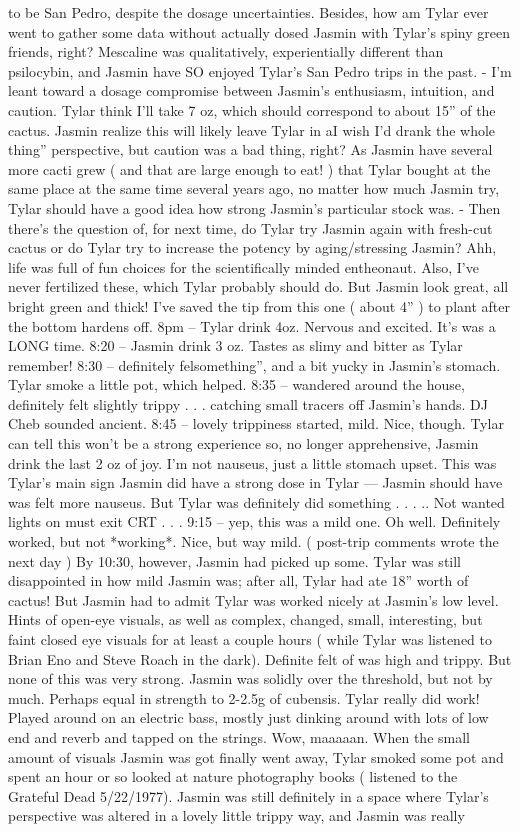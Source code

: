 \documentclass[12pt]{book}
\begin{document}
to be San Pedro, despite the dosage uncertainties. Besides, how am Tylar ever went to gather some data without actually dosed Jasmin with Tylar's spiny green friends, right? Mescaline was qualitatively, experientially different than psilocybin, and Jasmin have SO enjoyed Tylar's San Pedro trips in the past. - I'm leant toward a dosage compromise between Jasmin's enthusiasm, intuition, and caution. Tylar think I'll take 7 oz, which should correspond to about 15'' of the cactus. Jasmin realize this will likely leave Tylar in aI wish I'd drank the whole thing'' perspective, but caution was a bad thing, right? As Jasmin have several more cacti grew ( and that are large enough to eat! ) that Tylar bought at the same place at the same time several years ago, no matter how much Jasmin try, Tylar should have a good idea how strong Jasmin's particular stock was. - Then there's the question of, for next time, do Tylar try Jasmin again with fresh-cut cactus or do Tylar try to increase the potency by aging/stressing Jasmin? Ahh, life was full of fun choices for the scientifically minded entheonaut. Also, I've never fertilized these, which Tylar probably should do. But Jasmin look great, all bright green and thick! I've saved the tip from this one ( about 4'' ) to plant after the bottom hardens off. 8pm -- Tylar drink 4oz. Nervous and excited. It's was a LONG time. 8:20 -- Jasmin drink 3 oz. Tastes as slimy and bitter as Tylar remember! 8:30 -- definitely felsomething'', and a bit yucky in Jasmin's stomach. Tylar smoke a little pot, which helped. 8:35 -- wandered around the house, definitely felt slightly trippy . . . catching small tracers off Jasmin's hands. DJ Cheb sounded ancient. 8:45 -- lovely trippiness started, mild. Nice, though. Tylar can tell this won't be a strong experience so, no longer apprehensive, Jasmin drink the last 2 oz of joy. I'm not nauseus, just a little stomach upset. This was Tylar's main sign Jasmin did have a strong dose in Tylar --- Jasmin should have was felt more nauseus. But Tylar was definitely did something . . . .. Not wanted lights on must exit CRT . . .  9:15 -- yep, this was a mild one. Oh well. Definitely worked, but not *working*. Nice, but way mild. ( post-trip comments wrote the next day ) By 10:30, however, Jasmin had picked up some. Tylar was still disappointed in how mild Jasmin was; after all, Tylar had ate 18'' worth of cactus! But Jasmin had to admit Tylar was worked nicely at Jasmin's low level. Hints of open-eye visuals, as well as complex, changed, small, interesting, but faint closed eye visuals for at least a couple hours ( while Tylar was listened to Brian Eno and Steve Roach in the dark). Definite felt of was high and trippy. But none of this was very strong. Jasmin was solidly over the threshold, but not by much. Perhaps equal in strength to 2-2.5g of cubensis. Tylar really did work! Played around on an electric bass, mostly just dinking around with lots of low end and reverb and tapped on the strings. Wow, maaaaan. When the small amount of visuals Jasmin was got finally went away, Tylar smoked some pot and spent an hour or so looked at nature photography books ( listened to the Grateful Dead 5/22/1977). Jasmin was still definitely in a space where Tylar's perspective was altered in a lovely little trippy way, and Jasmin was really 
\end{document}
